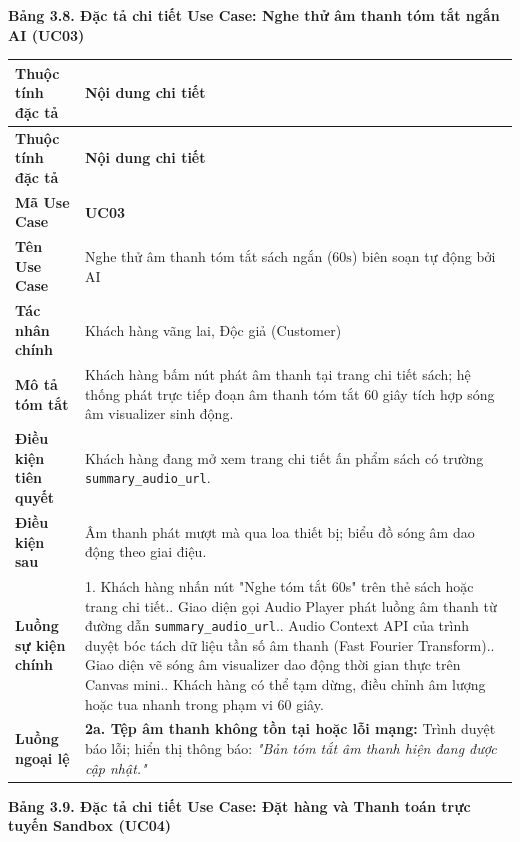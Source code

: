 \documentclass[11pt, a4paper]{report}
\begin{document}
\vspace{0.3cm}
\noindent\textbf{Bảng 3.8. Đặc tả chi tiết Use Case: Nghe thử âm thanh tóm tắt ngắn AI (UC03)}

\begin{longtable}{p{3.8cm} p{10.5cm}}
\toprule
\textbf{Thuộc tính đặc tả} & \textbf{Nội dung chi tiết} \\
\midrule
\endfirsthead
\toprule
\textbf{Thuộc tính đặc tả} & \textbf{Nội dung chi tiết} \\
\midrule
\endhead
\bottomrule
\endfoot
\textbf{Mã Use Case} & \textbf{UC03} \\
\midrule
\textbf{Tên Use Case} & Nghe thử âm thanh tóm tắt sách ngắn ($60\text{s}$) biên soạn tự động bởi AI \\
\midrule
\textbf{Tác nhân chính} & Khách hàng vãng lai, Độc giả (Customer) \\
\midrule
\textbf{Mô tả tóm tắt} & Khách hàng bấm nút phát âm thanh tại trang chi tiết sách; hệ thống phát trực tiếp đoạn âm thanh tóm tắt 60 giây tích hợp sóng âm visualizer sinh động. \\
\midrule
\textbf{Điều kiện tiên quyết} & Khách hàng đang mở xem trang chi tiết ấn phẩm sách có trường \texttt{summary\_audio\_url}. \\
\midrule
\textbf{Điều kiện sau} & Âm thanh phát mượt mà qua loa thiết bị; biểu đồ sóng âm dao động theo giai điệu. \\
\midrule
\textbf{Luồng sự kiện chính} & 
1. Khách hàng nhấn nút "Nghe tóm tắt 60s" trên thẻ sách hoặc trang chi tiết.\newline
2. Giao diện gọi Audio Player phát luồng âm thanh từ đường dẫn \texttt{summary\_audio\_url}.\newline
3. Audio Context API của trình duyệt bóc tách dữ liệu tần số âm thanh (Fast Fourier Transform).\newline
4. Giao diện vẽ sóng âm visualizer dao động thời gian thực trên Canvas mini.\newline
5. Khách hàng có thể tạm dừng, điều chỉnh âm lượng hoặc tua nhanh trong phạm vi 60 giây. \\
\midrule
\textbf{Luồng ngoại lệ} & 
\textbf{2a. Tệp âm thanh không tồn tại hoặc lỗi mạng:} Trình duyệt báo lỗi; hiển thị thông báo: \textit{"Bản tóm tắt âm thanh hiện đang được cập nhật."} \\
\bottomrule
\end{longtable}

\vspace{0.3cm}
\noindent\textbf{Bảng 3.9. Đặc tả chi tiết Use Case: Đặt hàng và Thanh toán trực tuyến Sandbox (UC04)}
\end{document}

